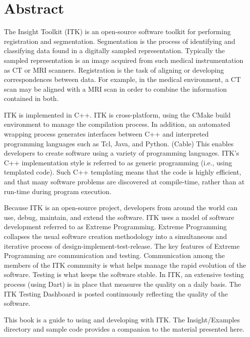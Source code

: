 \chapter*{Abstract}
\noindent
The Insight Toolkit (ITK) is an open-source software toolkit for
performing registration and segmentation. Segmentation is the process
of identifying and classifying data found in a digitally sampled
representation. Typically the sampled representation is an image
acquired from such medical instrumentation as CT or MRI
scanners. Registration is the task of aligning or developing
correspondences between data. For example, in the medical environment,
a CT scan may be aligned with a MRI scan in order to combine the
information contained in both.

ITK is implemented in C++. ITK is cross-platform, using the CMake
build environment to manage the compilation process. In addition, an
automated wrapping process generates interfaces between C++ and
interpreted programming languages such as Tcl, Java, and
Python. (Cable) This enables developers to create software using a
variety of programming languages. ITK's C++ implementation style is
referred to as generic programming (i.e., using templated code). Such
C++ templating means that the code is highly efficient, and that many
software problems are discovered at compile-time, rather than at
run-time during program execution.

Because ITK is an open-source project, developers from around the
world can use, debug, maintain, and extend the software. ITK uses a
model of software development referred to as Extreme
Programming. Extreme Programming collapses the usual software creation
methodology into a simultaneous and iterative process of
design-implement-test-release. The key features of Extreme Programming
are communication and testing. Communication among the members of the
ITK community is what helps manage the rapid evolution of the
software.  Testing is what keeps the software stable. In ITK, an
extensive testing process (using Dart) is in place that measures the
quality on a daily basis. The ITK Testing Dashboard is posted
continuously reflecting the quality of the software.

This book is a guide to using and developing with ITK. The
Insight/Examples directory and sample code provides a companion to the
material presented here.



